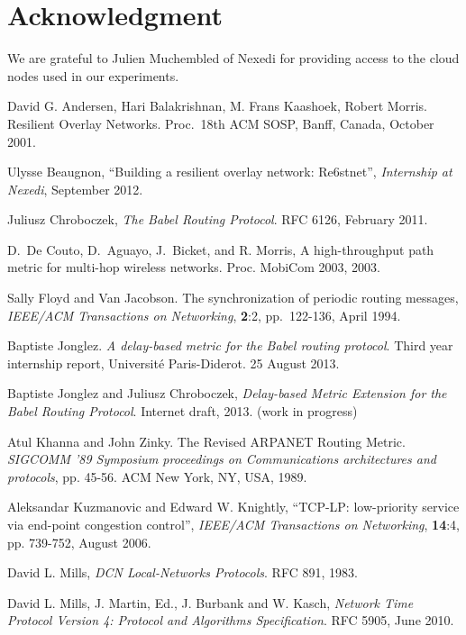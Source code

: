 \documentclass[conference,letterpaper]{IEEEtran}
\begin{document}
\section*{Acknowledgment}

We are grateful to Julien Muchembled of Nexedi for providing access to
the cloud nodes used in our experiments.

\begin{thebibliography}{99}

 David G. Andersen, Hari Balakrishnan, M. Frans Kaashoek,
  Robert Morris.  Resilient Overlay Networks.  Proc.\ 18th ACM SOSP,
  Banff, Canada, October 2001.

 Ulysse Beaugnon, ``Building a resilient overlay
  network: Re6stnet'', \emph{Internship at Nexedi}, September 2012.

  Juliusz Chroboczek,
  \emph{The Babel Routing Protocol}.
  RFC 6126,
  February 2011.

 D.\ De Couto, D.\ Aguayo, J.\ Bicket, and R. Morris, A
  high-throughput path metric for multi-hop wireless networks.
  Proc. MobiCom 2003, 2003.

 Sally Floyd and Van Jacobson. The synchronization of
  periodic routing messages, \emph{IEEE/ACM Transactions on
    Networking}, \textbf{2}:2, pp.\ 122-136, April 1994.

 Baptiste Jonglez.  \emph{A delay-based
    metric for the Babel routing protocol}.  Third year internship
  report, Université Paris-Diderot.  25 August 2013.

 Baptiste Jonglez and Juliusz Chroboczek,
  \emph{Delay-based Metric Extension for the Babel Routing Protocol}.
  Internet draft, 2013. (work in progress)

 Atul Khanna and John Zinky.  The Revised ARPANET
  Routing Metric. \emph{SIGCOMM '89 Symposium proceedings on
    Communications architectures and protocols}, pp. 45-56.  ACM New
  York, NY, USA, 1989.

 Aleksandar Kuzmanovic and Edward W. Knightly, ``TCP-LP:
  low-priority service via end-point congestion control'',
  \emph{IEEE/ACM Transactions on Networking}, \textbf{14}:4,
  pp. 739-752, August 2006.

 David L. Mills, \emph{DCN Local-Networks Protocols}.
  RFC 891, 1983.

 David L. Mills, J. Martin, Ed., J. Burbank and
  W. Kasch, \emph{Network Time Protocol Version 4: Protocol and
    Algorithms Specification}.  RFC 5905, June 2010.


\end{thebibliography}
\end{document}
